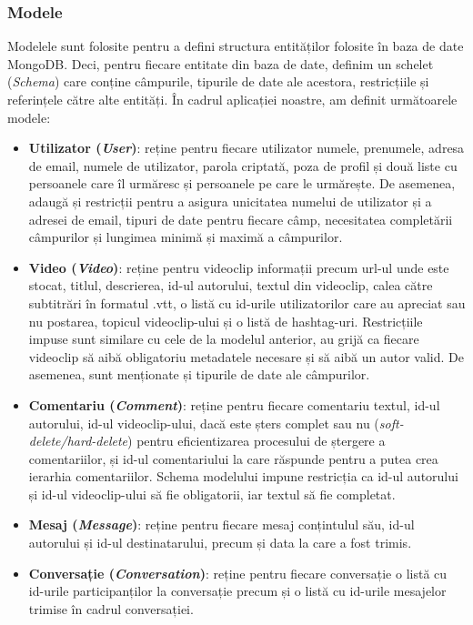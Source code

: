 \subsubsection{Modele}
Modelele sunt folosite pentru a defini structura entităților folosite în baza de date MongoDB. Deci,
pentru fiecare entitate din baza de date, definim un schelet (\textit{Schema}) care conține câmpurile,
tipurile de date ale acestora, restricțiile și referințele către alte entități. În cadrul aplicației
noastre, am definit următoarele modele:
\begin{itemize}
    \item \textbf{Utilizator (\textit{User})}: reține pentru fiecare utilizator numele, prenumele,
    adresa de email, numele de utilizator, parola criptată, poza de profil și două liste cu persoanele
    care îl urmăresc și persoanele pe care le urmărește. De asemenea, adaugă și restricții
    pentru a asigura unicitatea numelui de utilizator și a adresei de email, tipuri de date pentru
    fiecare câmp, necesitatea completării câmpurilor și lungimea minimă și maximă a câmpurilor.
    \item \textbf{Video (\textit{Video})}: reține pentru videoclip informații precum url-ul unde
    este stocat, titlul, descrierea, id-ul autorului, textul din videoclip, calea către subtitrări în
    formatul .vtt, o listă cu id-urile utilizatorilor care au apreciat sau nu postarea, topicul
    videoclip-ului și o listă de hashtag-uri. Restricțiile impuse sunt similare cu cele de la modelul
    anterior, au grijă ca fiecare videoclip să aibă obligatoriu metadatele necesare și să aibă un
    autor valid. De asemenea, sunt menționate și tipurile de date ale câmpurilor.
    \item \textbf{Comentariu (\textit{Comment})}: reține pentru fiecare comentariu textul, id-ul autorului, id-ul videoclip-ului,
    dacă este șters complet sau nu (\textit{soft-delete/hard-delete}) pentru eficientizarea procesului de ștergere
    a comentariilor, și id-ul comentariului la care răspunde pentru a putea crea ierarhia comentariilor.
    Schema modelului impune restricția ca id-ul autorului și id-ul videoclip-ului să fie obligatorii,
    iar textul să fie completat.
    \item \textbf{Mesaj (\textit{Message})}: reține pentru fiecare mesaj conțintulul său, id-ul autorului 
    și id-ul destinatarului, precum și data la care a fost trimis. 
    \item \textbf{Conversație (\textit{Conversation})}: reține pentru fiecare conversație o listă cu id-urile
    participanților la conversație precum și o listă cu id-urile mesajelor trimise în cadrul conversației.
\end{itemize}


